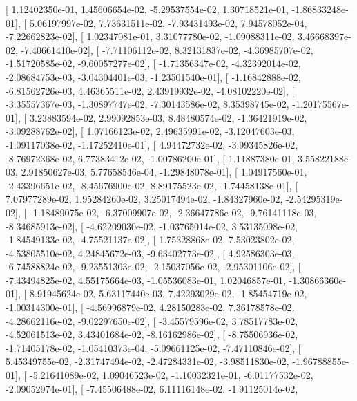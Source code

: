\documentclass{article}
\begin{document}
       [  1.12402350e-01,   1.45606654e-02,  -5.29537554e-02,
          1.30718521e-01,  -1.86833248e-01],
       [  5.06197997e-02,   7.73631511e-02,  -7.93431493e-02,
          7.94578052e-04,  -7.22662823e-02],
       [  1.02347081e-01,   3.31077780e-02,  -1.09088311e-02,
          3.46668397e-02,  -7.40661410e-02],
       [ -7.71106112e-02,   8.32131837e-02,  -4.36985707e-02,
         -1.51720585e-02,  -9.60057277e-02],
       [ -1.71356347e-02,  -4.32392014e-02,  -2.08684753e-03,
         -3.04304401e-03,  -1.23501540e-01],
       [ -1.16842888e-02,  -6.81562726e-03,   4.46365511e-02,
          2.43919932e-02,  -4.08102220e-02],
       [ -3.35557367e-03,  -1.30897747e-02,  -7.30143586e-02,
          8.35398745e-02,  -1.20175567e-01],
       [  3.23883594e-02,   2.99092853e-03,   8.48480574e-02,
         -1.36421919e-02,  -3.09288762e-02],
       [  1.07166123e-02,   2.49635991e-02,  -3.12047603e-03,
         -1.09117038e-02,  -1.17252410e-01],
       [  4.94472732e-02,  -3.99345826e-02,  -8.76972368e-02,
          6.77383412e-02,  -1.00786200e-01],
       [  1.11887380e-01,   3.55822188e-03,   2.91850627e-03,
          5.77658546e-04,  -1.29848078e-01],
       [  1.04917560e-01,  -2.43396651e-02,  -8.45676900e-02,
          8.89175523e-02,  -1.74458138e-01],
       [  7.07977289e-02,   1.95284260e-02,   3.25017494e-02,
         -1.84327960e-02,  -2.54295319e-02],
       [ -1.18489075e-02,  -6.37009907e-02,  -2.36647786e-02,
         -9.76141118e-03,  -8.34685913e-02],
       [ -4.62209030e-02,  -1.03765014e-02,   3.53135098e-02,
         -1.84549133e-02,  -4.75521137e-02],
       [  1.75328868e-02,   7.53023802e-02,  -4.53805510e-02,
          4.24845672e-03,  -9.63402773e-02],
       [  4.92586303e-03,  -6.74588824e-02,  -9.23551303e-02,
         -2.15037056e-02,  -2.95301106e-02],
       [ -7.43494825e-02,   4.55175664e-03,  -1.05536083e-01,
          1.02046857e-01,  -1.30866360e-01],
       [  8.91945624e-02,   5.63117440e-03,   7.42293029e-02,
         -1.85454719e-02,  -1.00314300e-01],
       [ -4.56996879e-02,   4.28150283e-02,   7.36178578e-02,
         -4.28662116e-02,  -9.02297650e-02],
       [ -3.45579596e-02,   3.78517783e-02,  -4.52061513e-02,
          3.43401684e-02,  -8.16162986e-02],
       [ -8.75506936e-02,  -1.71405178e-02,  -1.05410373e-04,
         -5.09661125e-02,  -7.47110846e-02],
       [  5.45349755e-02,  -2.31747494e-02,  -2.47284331e-02,
         -3.98511830e-02,  -1.96788855e-01],
       [ -5.21641089e-02,   1.09046523e-02,  -1.10032321e-01,
         -6.01177532e-02,  -2.09052974e-01],
       [ -7.45506488e-02,   6.11116148e-02,  -1.91125014e-02,
\end{document}

